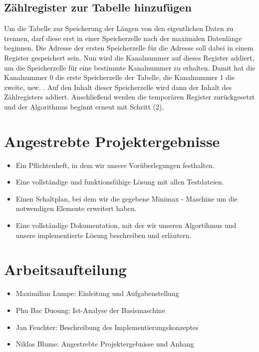 \documentclass[12pt,titlepage,german,a4]{article}
\begin{document}
    \subsection{Z{\"a}hlregister zur Tabelle hinzuf{\"u}gen}
    Um die Tabelle zur Speicherung der L{\"a}ngen von den eigentlichen Daten zu trennen, darf diese erst in einer Speicherzelle nach der maximalen Datenl{\"a}nge beginnen. Die Adresse der ersten Speicherzelle f{\"u}r die Adresse soll dabei in einem Register gespeichert sein. Nun wird die Kanalnummer auf dieses Register addiert, um die Speicherzelle f{\"u}r eine bestimmte Kanalnummer zu erhalten. Damit hat die Kanalnummer 0 die erste Speicherzelle der Tabelle, die Kanalnummer 1 die zweite, usw. . Auf den Inhalt dieser Speicherzelle wird dann der Inhalt des Z{\"a}hlregisters addiert. Anschlie{\ss}end werden die tempor{\"a}ren Register zur{\"u}ckgesetzt und der Algorithmus beginnt erneut mit Schritt (2).



    \section{Angestrebte Projektergebnisse}
        \begin{itemize}
			\item Ein Pflichtenheft, in dem wir unsere Vor{\"u}berlegungen festhalten.
			\item Eine vollst{\"a}ndige und funktionsf{\"a}hige L{\"o}sung mit allen Testdateien.
			\item Einen Schaltplan, bei dem wir die gegebene Minimax - Maschine um die notwendigen Elemente erweitert haben.
			\item Eine vollst{\"a}ndige Dokumentation, mit der wir unseren Algortihmus und unsere implementierte L{\"o}sung beschreiben und erl{\"a}utern.
        \end{itemize}

	\section{Arbeitsaufteilung}
		\begin{itemize}
			\item Maximilian Lumpe: Einleitung und Aufgabenstellung
			\item Phu Bac Duoung: Ist-Analyse der Basismaschine
			\item Jan Feuchter: Beschreibung des Implementierungskonzeptes
			\item Niklas Blume: Angestrebte Projektergebnisse und Anhang
		\end{itemize}
\end{document}
